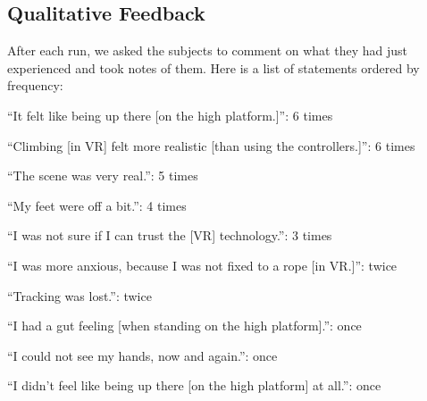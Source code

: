 \subsection{Qualitative Feedback}

After each run, we asked the subjects to comment on what they had just experienced and took notes of them. Here is a list of statements ordered by frequency:
\begin{itemize*}[itemjoin={{, }},itemjoin*={{, and }},noitemsep,nolistsep]
	\item[] “It felt like being up there [on the high platform.]”: 6 times
	\item[] “Climbing [in VR] felt more realistic [than using the controllers.]”: 6 times
	\item[] “The scene was very real.”: 5 times
	\item[] “My feet were off a bit.”: 4 times
	\item[] “I was not sure if I can trust the [\gls{VR}] technology.”: 3 times
	\item[] “I was more anxious, because I was not fixed to a rope [in \gls{VR}.]”: twice
	\item[] “Tracking was lost.”: twice
	\item[] “I had a gut feeling [when standing on the high platform].”: once
    \item[] “I could not see my hands, now and again.”: once
    \item[] “I didn't feel like being up there [on the high platform] at all.”: once
\end{itemize*}

 